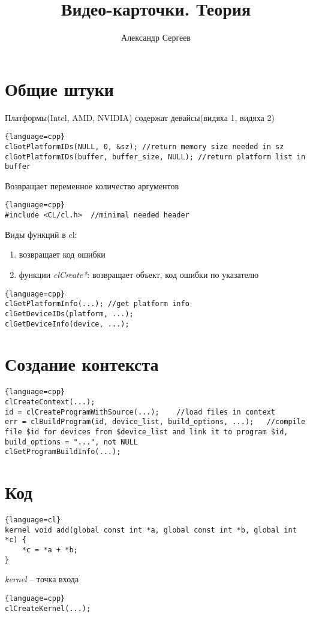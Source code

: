 \documentclass[12pt]{article}
\title{Видео-карточки. Теория}
\author{Александр Сергеев}
\date{}
\begin{document}
\maketitle
\section{Общие штуки}
Платформы(Intel, AMD, NVIDIA) содержат девайсы(видяха 1, видяха 2)
\begin{lstlisting}{language=cpp}
clGotPlatformIDs(NULL, 0, &sz); //return memory size needed in sz
clGotPlatformIDs(buffer, buffer_size, NULL); //return platform list in buffer
\end{lstlisting}
Возвращает переменное количество аргументов
\begin{lstlisting}{language=cpp}
#include <CL/cl.h>  //minimal needed header
\end{lstlisting}
Виды функций в cl:
\begin{enumerate}
    \item возвращает код ошибки
    \item функции \textit{clCreate*}: возвращает объект, код ошибки по указателю
\end{enumerate}
\begin{lstlisting}{language=cpp}
clGetPlatformInfo(...); //get platform info
clGetDeviceIDs(platform, ...);
clGetDeviceInfo(device, ...);
\end{lstlisting}
\section{Создание контекста}
\begin{lstlisting}{language=cpp}
clCreateContext(...);
id = clCreateProgramWithSource(...);    //load files in context
err = clBuildProgram(id, device_list, build_options, ...);   //compile file $id for devices from $device_list and link it to program $id, build_options = "...", not NULL
clGetProgramBuildInfo(...);
\end{lstlisting}
\section{Код}
\begin{lstlisting}{language=cl}
kernel void add(global const int *a, global const int *b, global int *c) {
    *c = *a + *b;
}
\end{lstlisting}
\textit{kernel} -- точка входа
\begin{lstlisting}{language=cpp}
clCreateKernel(...);
\end{lstlisting}
\end{document}

